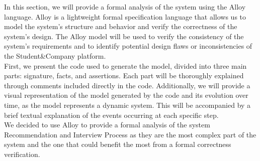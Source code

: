 In this section, we will provide a formal analysis of the system using the Alloy language. Alloy is a lightweight formal specification language that allows us to model the system's structure and behavior and verify the correctness of the system's design. The Alloy model will be used to verify the consistency of the system's requirements and to identify potential design flaws or inconsistencies of the Student&Company platform. \\
First, we present the code used to generate the model, divided into three main parts: signature, facts, and assertions. Each part will be thoroughly explained through comments included directly in the code. Additionally, we will provide a visual representation of the model generated by the code and its evolution over time, as the model represents a dynamic system. This will be accompanied by a brief textual explanation of the events occurring at each specific step.\\
We decided to use Alloy to provide a formal analysis of the system Recommendation and Interview Process as they are the most complex part of the system and the one that could benefit the most from a formal correctness verification.\\


